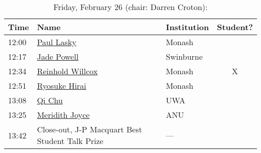 \documentclass[amsmath,onecolumn]{revtex4-1}
\begin{document}
\begin{table}[!htbp]
	\centering
	\caption{Friday, February 26 (chair: Darren Croton):}
\begin{tabular}{| l | l | l | c |}
	\hline
	Time & Name  & Institution & Student? \\ 		
	\hline
	12:00 & \href{https://forms.gle/5zQExyhhtw61iBjh6}{Paul Lasky} & Monash & \\
	12:17 & \href{https://forms.gle/RAKPA5sWbEmsJeVe7}{Jade Powell} & Swinburne & \\
	12:34 & \href{https://forms.gle/mc3CyZw6rRgSdu3J8}{Reinhold Willcox} &  Monash & X \\
	12:51 & \href{https://forms.gle/S4xaieMmyKJPYCtB7}{Ryosuke Hirai}  & Monash & \\
	13:08 & \href{https://forms.gle/sry4uusSGkfKRFRq9}{Qi Chu} & UWA & \\
	13:25 & \href{https://forms.gle/e2Fsotvn7miMXe4F6}{Meridith Joyce} & ANU  & \\
	13:42 & Close-out, J-P Macquart Best Student Talk Prize & --- & \\
	\hline
\end{tabular}
\end{table}
\end{document}
